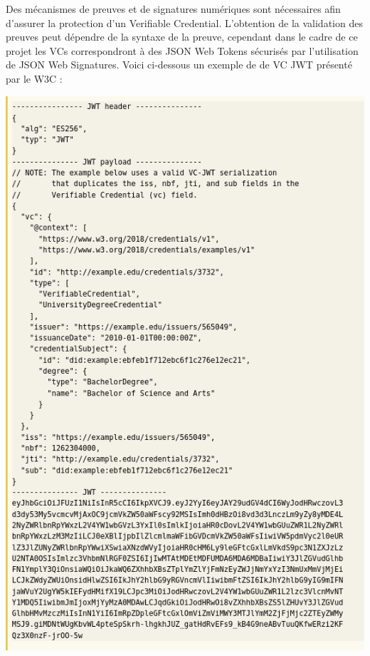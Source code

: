 \documentclass[12pt, openany]{report}
\begin{document}
\begin{flushleft}
Des mécanismes de preuves et de signatures numériques sont nécessaires afin d'assurer la protection d'un Verifiable Credential. L'obtention de la validation des preuves peut dépendre de la syntaxe de la preuve, cependant dans le cadre de ce projet les VCs correspondront à des JSON Web Tokens sécurisés par l'utilisation de JSON Web Signatures. Voici ci-dessous un exemple de de VC JWT présenté par le W3C :\\
\begin{center}
\includegraphics[scale=0.4]{vc2.png}
\end{center}
\end{flushleft}
\end{document}
